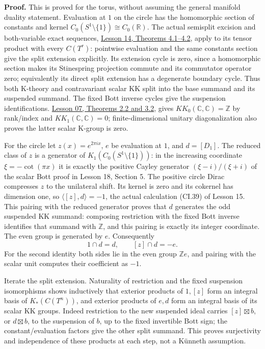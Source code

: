 \documentclass[
  11pt,
]{article}
\begin{document}
\textbf{Proof.} This is proved for the torus, without assuming the
general manifold duality statement. Evaluation at \(1\) on the circle
has the homomorphic section of constants and kernel
\(C_0(S^1\setminus\{1\})\cong C_0(\mathbb R)\). The actual semisplit
excision and both-variable exact sequences,
\href{KT-KK-14.html\#4-excision-and-the-six-term-sequences}{Lesson 14,
Theorems 4.1--4.2}, apply to its tensor product with every \(C(T^r)\):
pointwise evaluation and the same constants section give the split
extension explicitly. Its extension cycle is zero, since a homomorphic
section makes its Stinespring projection commute and its commutator
operator zero; equivalently its direct split extension has a degenerate
boundary cycle. Thus both K-theory and contravariant scalar KK split
into the base summand and its suspended summand. The fixed Bott inverse
cycles give the suspension identifications.
\href{KT-KK-07.html\#2-the-even-scalar-fredholm-picture}{Lesson 07,
Theorems 2.2 and 3.2}, gives \(KK_0(\mathbb C,\mathbb C)=\mathbb Z\) by
rank/index and \(KK_1(\mathbb C,\mathbb C)=0\); finite-dimensional
unitary diagonalization also proves the latter scalar K-group is zero.

For the circle let \(z(x)=e^{2\pi ix}\), \(e\) be evaluation at \(1\),
and \(d=[D_1]\). The reduced class of \(z\) is a generator of
\(K_1(C_0(S^1\setminus\{1\}))\): in the increasing coordinate
\(\xi=-\cot(\pi x)\) it is exactly the positive Cayley generator
\((\xi-i)/(\xi+i)\) of the scalar Bott proof in Lesson 18, Section 5.
The positive circle Dirac compresses \(z\) to the unilateral shift. Its
kernel is zero and its cokernel has dimension one, so
\(\langle[z],d\rangle=-1\), the actual calculation (CI.39) of Lesson 15.
This pairing with the reduced generator proves that \(d\) generates the
odd suspended KK summand: composing restriction with the fixed Bott
inverse identifies that summand with \(\mathbb Z\), and this pairing is
exactly its integer coordinate. The even group is generated by \(e\).
Consequently \[
 1\cap d=d,\qquad [z]\cap d=-e.
 \tag{T2}
\] For the second identity both sides lie in the even group
\(\mathbb Z e\), and pairing with the scalar unit computes their
coefficient as \(-1\).

Iterate the split extension. Naturality of restriction and the fixed
suspension isomorphisms shows inductively that exterior products of
\(1,[z]\) form an integral basis of \(K_*(C(T^n))\), and exterior
products of \(e,d\) form an integral basis of its scalar KK groups.
Indeed restriction to the new suspended ideal carries
\([z]\boxtimes b\), or \(d\boxtimes b\), to the suspension of \(b\), up
to the fixed invertible Bott sign; the constant/evaluation factors give
the other split summand. This proves surjectivity and independence of
these products at each step, not a Künneth assumption.
\end{document}

